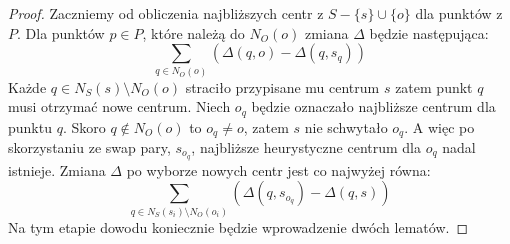 \begin{proof}
    Zaczniemy od obliczenia najbliższych centr z $S - \{s\} \cup \{o\}$ dla punktów z $P$.
    Dla punktów $p \in P$, które należą do $N_{O}(o)$ zmiana $\Delta$ będzie następująca:
    \begin{equation}
        \sum_{q \in N_{O}(o)} (\Delta(q, o) - \Delta(q, s_{q}))
    \end{equation}
    Każde $q \in N_{S}(s) \setminus N_{O}(o)$ straciło przypisane mu centrum $s$ zatem punkt $q$ musi otrzymać nowe centrum.
    Niech $o_{q}$ będzie oznaczało najbliższe centrum dla punktu $q$.
    Skoro $q \notin N_{O}(o)$ to $o_{q} \neq o$, zatem $s$ nie schwytało $o_{q}$.
    A więc po skorzystaniu ze swap pary, $s_{o_{q}}$, najbliższe heurystyczne centrum dla $o_{q}$ nadal istnieje.
    Zmiana $\Delta$ po wyborze nowych centr jest co najwyżej równa:
    \begin{equation}
        \sum_{q \in N_{S}(s_{i}) \setminus N_{O}(o_{i})} (\Delta(q, s_{o_{q}}) - \Delta(q, s))
    \end{equation}
    Na tym etapie dowodu koniecznie będzie wprowadzenie dwóch lematów.
    

\end{proof}
